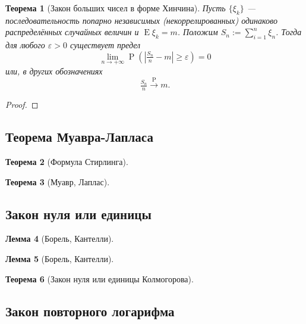 \documentclass[12pt]{article}
\newtheorem{theorem}{Теорема}
\newtheorem{lemma}[theorem]{Лемма}
\numberwithin{theorem}{section}
\theoremstyle{definition}
\newcommand{\prob}{\operatorname{P}}
\newcommand{\expect}{\operatorname{E}}
\begin{document}
	\begin{theorem}[Закон больших чисел в форме Хинчина]
		Пусть $ \{\xi_k\} $ --- последовательность попарно независимых (некоррелированных)
		одинаково распределённых случайных величин и $ \expect\xi_k = m $. 
		Положим $ S_n := \sum\limits_{i = 1}^{n} \xi_n $.
		Тогда для любого $ \varepsilon > 0 $ существует предел
		$$ \lim\limits_{n \to +\infty} \prob(|\tfrac{S_n}{n} - m| \geqslant \varepsilon) = 0 $$ 
		или, в других обозначениях 
		$$ \tfrac{S_n}{n} \overset{\prob}{\to} m. $$
	\end{theorem}
	
	\begin{proof}
		
	\end{proof}
	
	\subsection{Теорема Муавра-Лапласа}
	
	
	
	\begin{theorem}[Формула Стирлинга]
		
	\end{theorem}
	
	\begin{theorem}[Муавр, Лаплас]
		
	\end{theorem}
	
	\subsection{Закон нуля или единицы}
	
	\begin{lemma}[Борель, Кантелли]
		
	\end{lemma}
	
	\begin{lemma}[Борель, Кантелли]
		
	\end{lemma}
	
	\begin{theorem}[Закон нуля или единицы Колмогорова]
		
	\end{theorem}
	
	\subsection{Закон повторного логарифма}
	
\end{document}
